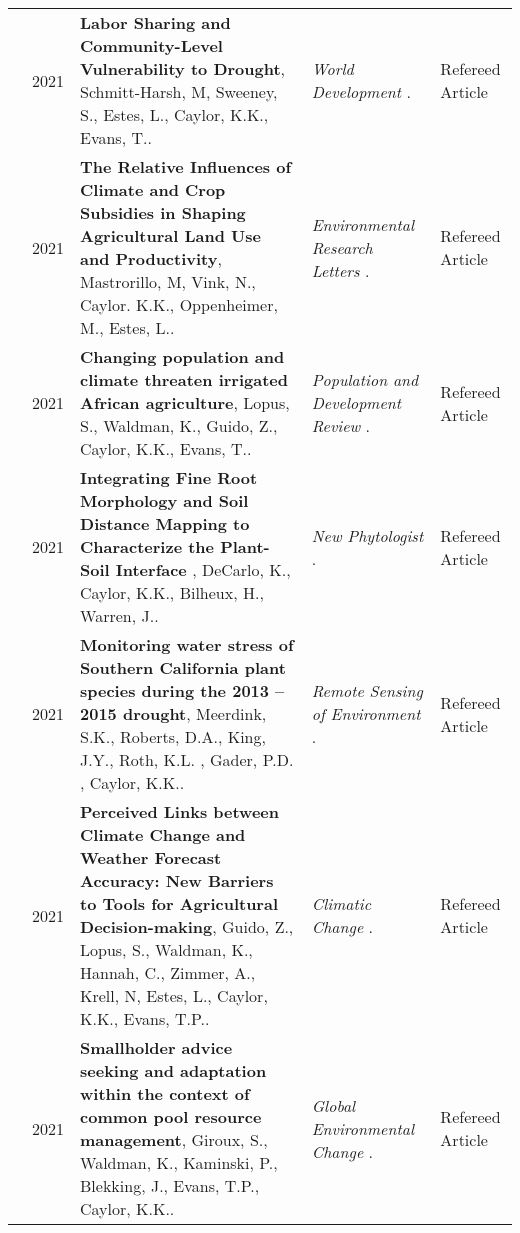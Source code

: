 \begin{longtable}{lcp{7.75cm}>{\raggedright}p{5.25cm}p{1.75cm}}
     & 2021 & {\bf Labor Sharing and Community-Level Vulnerability to Drought}, Schmitt-Harsh, M, Sweeney, S., Estes, L., Caylor, K.K., Evans, T..  & \emph{ World Development } .   & Refereed Article\\
     & 2021 & {\bf The Relative Influences of Climate and Crop Subsidies in Shaping Agricultural Land Use and Productivity}, Mastrorillo, M, Vink, N., Caylor. K.K., Oppenheimer, M., Estes, L..  & \emph{ Environmental Research Letters } .   & Refereed Article\\
     & 2021 & {\bf Changing population and climate threaten irrigated African agriculture}, Lopus, S., Waldman, K., Guido, Z., Caylor, K.K., Evans, T..  & \emph{ Population and Development Review } .   & Refereed Article\\
     & 2021 & {\bf Integrating Fine Root Morphology and Soil Distance Mapping to Characterize the Plant-Soil Interface }, DeCarlo, K., Caylor, K.K., Bilheux, H., Warren, J..  & \emph{ New Phytologist } .   & Refereed Article\\
     & 2021 & {\bf Monitoring water stress of Southern California plant species during the 2013 – 2015 drought}, Meerdink, S.K., Roberts, D.A., King, J.Y., Roth, K.L. , Gader, P.D. , Caylor, K.K..  & \emph{ Remote Sensing of Environment } .   & Refereed Article\\
     & 2021 & {\bf Perceived Links between Climate Change and Weather Forecast Accuracy: New Barriers to Tools for Agricultural Decision-making}, Guido, Z., Lopus, S., Waldman, K., Hannah, C., Zimmer, A., Krell, N, Estes, L., Caylor, K.K., Evans, T.P..  & \emph{ Climatic Change } .   & Refereed Article\\
     & 2021 & {\bf Smallholder advice seeking and adaptation within the context of common pool resource management}, Giroux, S., Waldman, K., Kaminski, P., Blekking, J., Evans, T.P., Caylor, K.K..  & \emph{ Global Environmental Change } .   & Refereed Article\\
\end{longtable}

